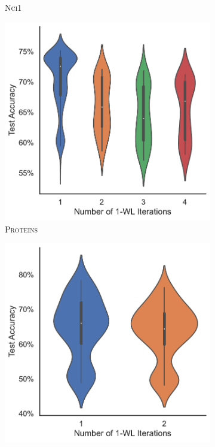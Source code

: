 \begin{figure}[!htb]
\begin{subfigure}[b]{0.19\textwidth}
        \caption{\scriptsize\textsc{Nci1}}
	\end{subfigure}
	\hfill
	\begin{subfigure}[b]{0.19\textwidth}
		\centering
		\includegraphics[width=\textwidth]{Figures/k_wl_violin_PROTEINS.pdf}
        \caption{\scriptsize\textsc{Proteins}}
	\end{subfigure}
	\par\bigskip
	\begin{subfigure}[b]{0.19\textwidth}
		\centering
		\includegraphics[width=\textwidth]{Figures/k_wl_violin_REDDIT-BINARY.pdf}

\end{subfigure}
\end{figure}
